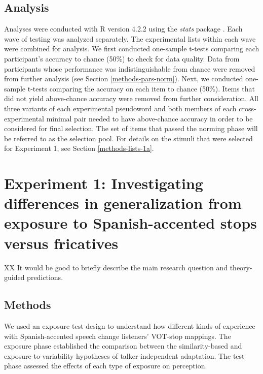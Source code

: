 \documentclass[preprint, 3p, authoryear]{elsarticle} %
\begin{document}
\hypertarget{methods-analysis-norm}{%
\subsection{Analysis}\label{methods-analysis-norm}}

Analyses were conducted with R version 4.2.2 using the \emph{stats} package \citep{rcore2022}.
Each wave of testing was analyzed separately.
The experimental lists within each wave were combined for analysis.
We first conducted one-sample t-tests comparing each participant's accuracy to chance (50\%) to check for data quality.
Data from participants whose performance was indistinguishable from chance were removed from further analysis (see Section \ref{methods-pars-norm}).
Next, we conducted one-sample t-tests comparing the accuracy on each item to chance (50\%).
Items that did not yield above-chance accuracy were removed from further consideration.
All three variants of each experimental pseudoword and both members of each cross-experimental minimal pair needed to have above-chance accuracy in order to be considered for final selection.
The set of items that passed the norming phase will be referred to as the selection pool.
For details on the stimuli that were selected for Experiment 1, see Section \ref{methods-lists-1a}.

\hypertarget{experiment-1-investigating-differences-in-generalization-from-exposure-to-spanish-accented-stops-versus-fricatives}{%
\section{Experiment 1: Investigating differences in generalization from exposure to Spanish-accented stops versus fricatives}\label{experiment-1-investigating-differences-in-generalization-from-exposure-to-spanish-accented-stops-versus-fricatives}}

XX It would be good to briefly describe the main research question and theory-guided predictions.

\hypertarget{methods}{%
\subsection{Methods}\label{methods}}

We used an exposure-test design to understand how different kinds of experience with Spanish-accented speech change listeners' VOT-stop mappings.
The exposure phase established the comparison between the similarity-based and exposure-to-variability hypotheses of talker-independent adaptation.
The test phase assessed the effects of each type of exposure on perception.
\end{document}
